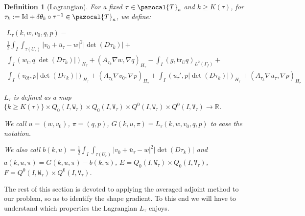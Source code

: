 \documentclass[english,a4paper,9pt,oneside]{scrbook}	%
\theoremstyle{break}
\newtheorem{defn}[equation]{Definition}
\theoremstyle{remark}
\newcommand{\mR}{\mathbb{R}}
\newcommand{\tr}{\text{tr}}
\newcommand{\cT}{\pazocal{T}}
\newcommand{\id}{\text{Id}}
\newcommand{\te}{\theta}
\newcommand{\tw}[1]{\texttt{#1}}
\begin{document}
\begin{defn}[Lagrangian]

For a fixed $\tau \in \cT_a$ and  $k\geq K(\tau)$, for $\tau_k:=\id+\delta\te_k \circ \tau^{-1} \in \cT_a$, we define:

\begin{align*}
L_\tau(k,w,v_0,q,p) = \\
\frac{1}{2}\int_I \int_{\tau(U_r)}|v_0+\bar{u}_\tau - w|^2|\det(D\tau_k)|+\\
\int_I ( w_t , q |\det(D\tau_k)|)_{H_\tau}+ (A_{\tau_k}\nabla w, \nabla q)_{H_\tau} -\int_I(g,\tr_{U} q)_{L^2(\Gamma_f)} +\\ \int_I (v_{0t},p |\det(D\tau_k)|)_{H_\tau} + (A_{\tau_k} \nabla v_0, \nabla p)_{H_\tau}+\int_I(\bar{u}_\tau',p|\det(D\tau_k)|)_{H_\tau}+(A_{\tau_k} \nabla \bar{u}_\tau , \nabla p)_{H_\tau}
\end{align*}

$L_\tau$ is defined as a map $\{k\geq K(\tau)\}\times Q_0(I, \tw{W}_\tau)\times Q_0(I,\tw{V}_\tau)\times Q^0(I, \tw{W}_\tau)\times Q^0(I, \tw{V}_\tau)\rightarrow \mR$.

We call $u = (w,v_0)$, $\pi = (q,p)$, $G(k,u,\pi) = L_\tau(k,w,v_0,q,p)$ to ease the notation.

We also call $b(k, u) = \frac{1}{2}\int_I \int_{\tau(U_r)}|v_0+\bar{u}_\tau - w|^2|\det(D\tau_k)|$ and $a(k, u,\pi) = G(k,u,\pi)-b(k, u)$, $E = Q_0(I, \tw{W}_\tau)\times Q_0(I,\tw{V}_\tau)$, $F=Q^0(I, \tw{W}_\tau)\times Q^0(I, \tw{V}_\tau)$.

\end{defn}

The rest of this section is devoted to applying the averaged adjoint method \cite{avg_adj} to our problem, so as to identify the shape gradient. To this end we will have to understand which properties the Lagrangian $L_\tau $ enjoys.
\end{document}
